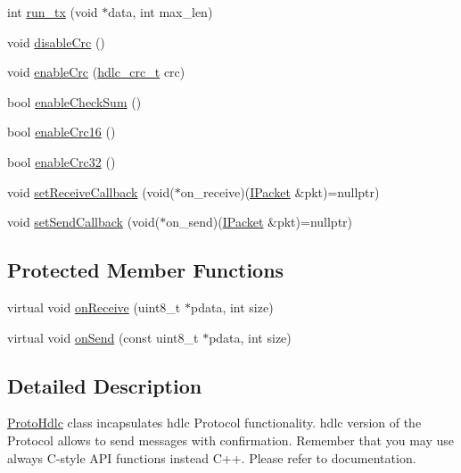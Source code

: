 \begin{DoxyCompactItemize}
int \hyperlink{classTiny_1_1ProtoHdlc_a73415a63c389b3cbd0601a2ed49fd6e9}{run\+\_\+tx} (void $\ast$data, int max\+\_\+len)
\item 
void \hyperlink{classTiny_1_1ProtoHdlc_a37506cfddcc0e1ed9a2ed697f4860b98}{disable\+Crc} ()
\item 
void \hyperlink{classTiny_1_1ProtoHdlc_a84e93210f940385a9408419ed605c8e5}{enable\+Crc} (\hyperlink{group__HDLC__API_gabb73b32d08d8e79eefe9385634a74bf7}{hdlc\+\_\+crc\+\_\+t} crc)
\item 
bool \hyperlink{classTiny_1_1ProtoHdlc_a3c9ed356b3d6dd4496b1655a0704e890}{enable\+Check\+Sum} ()
\item 
bool \hyperlink{classTiny_1_1ProtoHdlc_a693fb4301071e0b2d3bfd818265f22c6}{enable\+Crc16} ()
\item 
bool \hyperlink{classTiny_1_1ProtoHdlc_a2f0b1557415ea384e7b1279c3618d4c0}{enable\+Crc32} ()
\item 
void \hyperlink{classTiny_1_1ProtoHdlc_a781e046caaeaeeecd03fadd07c138f9f}{set\+Receive\+Callback} (void($\ast$on\+\_\+receive)(\hyperlink{classTiny_1_1IPacket}{I\+Packet} \&pkt)=nullptr)
\item 
void \hyperlink{classTiny_1_1ProtoHdlc_a1a2a3005901312563aad00154b8bfcf8}{set\+Send\+Callback} (void($\ast$on\+\_\+send)(\hyperlink{classTiny_1_1IPacket}{I\+Packet} \&pkt)=nullptr)
\end{DoxyCompactItemize}
\subsection*{Protected Member Functions}
\begin{DoxyCompactItemize}
\item 
virtual void \hyperlink{classTiny_1_1ProtoHdlc_afe7bd4445fb69598b80357869e2b785c}{on\+Receive} (uint8\+\_\+t $\ast$pdata, int size)
\item 
virtual void \hyperlink{classTiny_1_1ProtoHdlc_ae197714a219bf38e2408818334ee3108}{on\+Send} (const uint8\+\_\+t $\ast$pdata, int size)
\end{DoxyCompactItemize}


\subsection{Detailed Description}
\hyperlink{classTiny_1_1ProtoHdlc}{Proto\+Hdlc} class incapsulates hdlc Protocol functionality. hdlc version of the Protocol allows to send messages with confirmation. Remember that you may use always C-\/style A\+PI functions instead C++. Please refer to documentation. 

